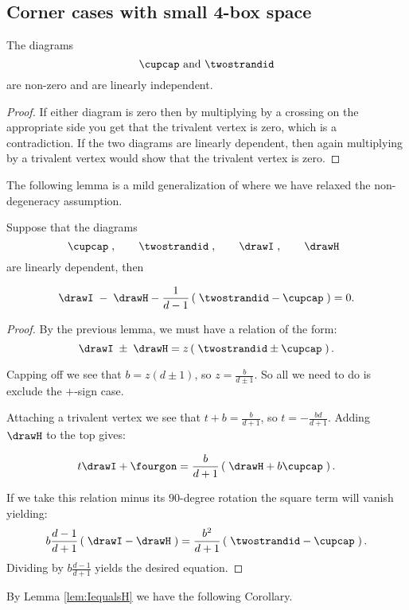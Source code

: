 \documentclass[12pt]{amsart}
\begin{document}
\subsection{Corner cases with small 4-box space}

\begin{lemma}
The diagrams
$$\cupcap \text{ and } \twostrandid$$
are non-zero and are linearly independent.
\end{lemma}
\begin{proof}
If either diagram is zero then by multiplying by a crossing on the appropriate side you get that the trivalent vertex is zero, which is a contradiction.  If the two diagrams are linearly dependent, then again multiplying by a trivalent vertex would show that the trivalent vertex is zero.
\end{proof}


The following lemma is a mild generalization of  where we have relaxed the non-degeneracy assumption.


\begin{lemma}
Suppose that the diagrams   
  \[
  \cupcap\;,\qquad\twostrandid\;,
    \qquad\drawI\;,\qquad\drawH\;\;
   \]
are linearly dependent, then
 
$$\drawI\; - \; \drawH - \frac{1}{d-1} \left(\; \twostrandid - \cupcap \; \right) = 0.$$
\end{lemma}
\begin{proof}
By the previous lemma, we must have a relation of the form:
$$\drawI\;\pm \; \drawH = z \left(\; \twostrandid \pm \cupcap \;\right).$$

Capping off we see that $b= z (d \pm 1)$, so $z = \frac{b}{d \pm 1}$.  So all we need to do is exclude the $+$-sign case.

Attaching a trivalent vertex we see that $t + b = \frac{b}{d + 1}$, so $t =  -\frac{b d}{d + 1}$.  Adding $\drawH$ to the top gives:

$$t \drawI + \fourgon = \frac{b}{d+1} \left(\; \drawH + b \cupcap \; \right).$$

If we take this relation minus its $90$-degree rotation the square term will vanish yielding:
$$ b \frac{d-1}{d+1} \left(\; \drawI -\drawH \; \right) = \frac{b^2}{d+1} \left(\; \twostrandid - \cupcap \; \right).$$
Dividing by $b \frac{d-1}{d+1}$ yields the desired equation.
\end{proof}

By Lemma \ref{lem:IequalsH} we have the following Corollary.
\end{document}
